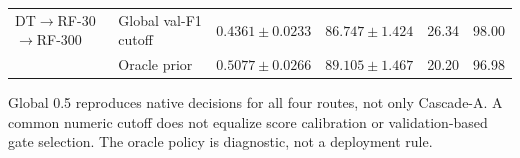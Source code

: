 \begin{table}[!htbp]
\begin{tabularx}{\textwidth}{@{}lXrrrr@{}}
\addlinespace
DT$\to$RF-30$\to$RF-300 & Global val-F1 cutoff & $0.4361\pm0.0233$ & $86.747\pm1.424$ & 26.34 & 98.00 \\
 & Oracle prior & $0.5077\pm0.0266$ & $89.105\pm1.467$ & 20.20 & 96.98 \\
\bottomrule
\end{tabularx}
\par\smallskip
\begin{minipage}{\textwidth}\footnotesize Global 0.5 reproduces native decisions for all four routes, not only Cascade-A. A common numeric cutoff does not equalize score calibration or validation-based gate selection. The oracle policy is diagnostic, not a deployment rule.\end{minipage}
\end{table}
